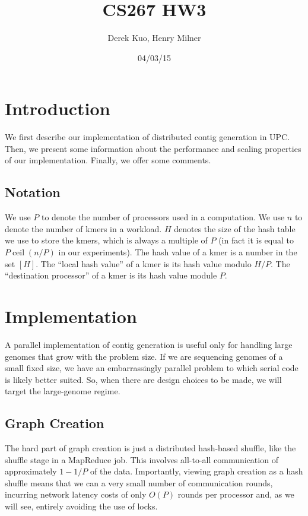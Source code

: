 \documentclass{article}
\author{Derek Kuo, Henry Milner}
\title{CS267 HW3}
\date{04/03/15}
\begin{document}
\maketitle

\section{Introduction}
We first describe our implementation of distributed contig generation in UPC.  Then, we present some information about the performance and scaling properties of our implementation.  Finally, we offer some comments.

\subsection{Notation}
We use $P$ to denote the number of processors used in a computation.  We use $n$ to denote the number of kmers in a workload.  $H$ denotes the size of the hash table we use to store the kmers, which is always a multiple of $P$ (in fact it is equal to $P \operatorname{ceil}(n/P)$ in our experiments).  The hash value of a kmer is a number in the set $[H]$.  The ``local hash value'' of a kmer is its hash value modulo $H/P$.  The ``destination processor'' of a kmer is its hash value module $P$.

\section{Implementation}
A parallel implementation of contig generation is useful only for handling large genomes that grow with the problem size.  If we are sequencing genomes of a small fixed size, we have an embarrassingly parallel problem to which serial code is likely better suited.  So, when there are design choices to be made, we will target the large-genome regime.

\subsection{Graph Creation}
The hard part of graph creation is just a distributed hash-based shuffle, like the shuffle stage in a MapReduce job.  This involves all-to-all communication of approximately $1-1/P$ of the data.  Importantly, viewing graph creation as a hash shuffle means that we can a very small number of communication rounds, incurring network latency costs of only $O(P)$ rounds per processor and, as we will see, entirely avoiding the use of locks.
\end{document}
